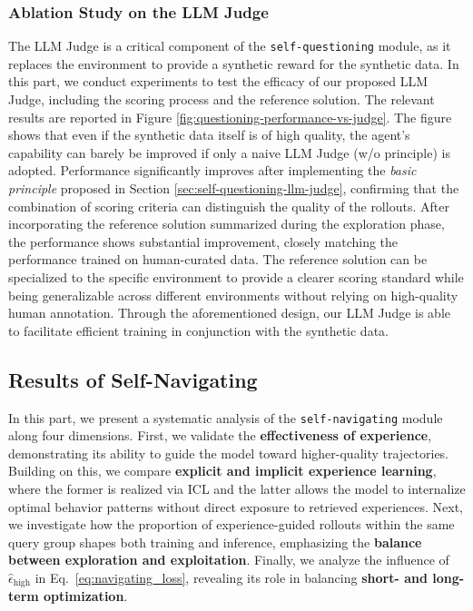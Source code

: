 \subsubsection{Ablation Study on the LLM Judge}

The LLM Judge is a critical component of the \texttt{self-questioning} module, as it replaces the environment to provide a synthetic reward for the synthetic data. In this part, we conduct experiments to test the efficacy of our proposed LLM Judge, including the scoring process and the reference solution. The relevant results are reported in Figure \ref{fig:questioning-performance-vs-judge}. The figure shows that even if the synthetic data itself is of high quality, the agent's capability can barely be improved if only a naive LLM Judge (w/o principle) is adopted. Performance significantly improves after implementing the \textit{basic principle} proposed in Section \ref{sec:self-questioning-llm-judge}, confirming that the combination of scoring criteria can distinguish the quality of the rollouts. After incorporating the reference solution summarized during the exploration phase, the performance shows substantial improvement, closely matching the performance trained on human-curated data. The reference solution can be specialized to the specific environment to provide a clearer scoring standard while being generalizable across different environments without relying on high-quality human annotation. Through the aforementioned design, our LLM Judge is able to facilitate efficient training in conjunction with the synthetic data.




\subsection{Results of Self-Navigating}\label{sec:experiment_self-navigatin}
In this part, we present a systematic analysis of the \texttt{self-navigating} module along four dimensions. 
First, we validate the \textbf{effectiveness of experience}, demonstrating its ability to guide the model toward higher-quality trajectories. 
Building on this, we compare \textbf{explicit and implicit experience learning}, where the former is realized via ICL and the latter allows the model to internalize optimal behavior patterns without direct exposure to retrieved experiences.
Next, we investigate how the proportion of experience-guided rollouts within the same query group shapes both training and inference, emphasizing the \textbf{balance between exploration and exploitation}. 
Finally, we analyze the influence of $\hat{\epsilon}_{\text{high}}$ in Eq.~\ref{eq:navigating_loss}, revealing its role in balancing \textbf{short- and long-term optimization}. 



